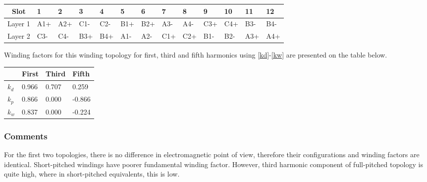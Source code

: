 \documentclass{reportClass}
\begin{document}
\begin{table}[h!] \centering
\begin{tabular}{|c|l|l|l|l|l|l|l|l|l|l|l|l|}
\hline
Slot    & 1                           & 2                           & 3                           & 4                           & 5                           & 6                           & 7                           & 8                           & 9                           & 10                          & 11                          & 12                          \\ \hline
Layer 1 & \cellcolor[HTML]{FCFF2F}A1+ & \cellcolor[HTML]{FCFF2F}A2+ & \cellcolor[HTML]{CBCEFB}C1- & \cellcolor[HTML]{CBCEFB}C2- & \cellcolor[HTML]{90E3FB}B1+ & \cellcolor[HTML]{90E3FB}B2+ & \cellcolor[HTML]{FCFF2F}A3- & \cellcolor[HTML]{FCFF2F}A4- & \cellcolor[HTML]{CBCEFB}C3+ & \cellcolor[HTML]{CBCEFB}C4+ & \cellcolor[HTML]{90E3FB}B3- & \cellcolor[HTML]{90E3FB}B4- \\ \hline
Layer 2 & \cellcolor[HTML]{CBCEFB}C3- & \cellcolor[HTML]{CBCEFB}C4- & \cellcolor[HTML]{90E3FB}B3+ & \cellcolor[HTML]{90E3FB}B4+ & \cellcolor[HTML]{FCFF2F}A1- & \cellcolor[HTML]{FCFF2F}A2- & \cellcolor[HTML]{CBCEFB}C1+ & \cellcolor[HTML]{CBCEFB}C2+ & \cellcolor[HTML]{90E3FB}B1- & \cellcolor[HTML]{90E3FB}B2- & \cellcolor[HTML]{FCFF2F}A3+ & \cellcolor[HTML]{FCFF2F}A4+ \\ \hline
\end{tabular}
\end{table}

Winding factors for this winding topology for first, third and fifth harmonics using \ref{kd}-\ref{kw} are presented on the table below.

\begin{table}[h!] \centering \centering
\begin{tabular}{|l|l|l|l|}
\hline
   & First & Third & Fifth  \\ \hline
$k_d$ & 0.966 & 0.707 & 0.259  \\ \hline
$k_p$ & 0.866 & 0.000 & -0.866 \\ \hline
$k_w$ & 0.837 & 0.000 & -0.224 \\ \hline
\end{tabular}
\end{table}

\subsubsection{Comments}

For the first two topologies, there is no difference in electromagnetic point of view, therefore their configurations and winding factors are identical. Short-pitched windings have poorer fundamental winding factor. However, third harmonic component of full-pitched topology is quite high, where in short-pitched equivalents, this is low.\\
\end{document}
